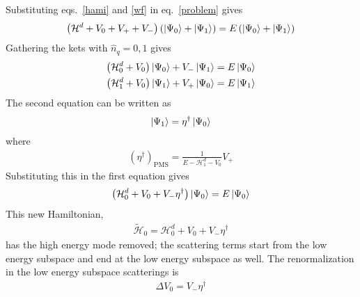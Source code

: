 Substituting eqs.~\ref{hami} and \ref{wf} in eq.~\ref{problem} gives
\begin{equation}\begin{aligned}
	\left(\mathcal{H}^d + V_0 + V_+ + V_-\right)\left(\ket{\Psi_0} + \ket{\Psi_1}\right) = E\left(\ket{\Psi_0} + \ket{\Psi_1}\right)
\end{aligned}\end{equation}
Gathering the kets with \(\hat n_q = 0,1\) gives
\begin{equation}\begin{aligned}
	\left(\mathcal{H}^d_0 + V_0\right)\ket{\Psi_0} + V_- \ket{\Psi_1} = E\ket{\Psi_0}\\
	\left(\mathcal{H}^d_1 + V_0\right)\ket{\Psi_1} + V_+\ket{\Psi_0} = E\ket{\Psi_1}
\end{aligned}\end{equation}
The second equation can be written as
\begin{equation}\begin{aligned}
\ket{\Psi_1} = \eta^\dagger \ket{\Psi_0}
\end{aligned}\end{equation}
where
\begin{equation}\begin{aligned}
	\left(\eta^\dagger\right)_\text{PMS} = \frac{1}{E - \mathcal{H}^d_1 - V_0}V_+
\end{aligned}\end{equation}
Substituting this in the first equation gives
\begin{equation}\begin{aligned}
	\label{reneq}
	\left(\mathcal{H}^d_0 + V_0 + V_- \eta^\dagger\right)\ket{\Psi_0} = E\ket{\Psi_0}
\end{aligned}\end{equation}
This new Hamiltonian,
\begin{equation}\begin{aligned}
	\tilde{\mathcal{H}}_0 = \mathcal{H}^d_0 + V_0 + V_- \eta^\dagger
\end{aligned}\end{equation}
has the high energy mode removed; the scattering terms start from the low energy subspace and end at the low energy subspace as well. The renormalization in the low energy subspace scatterings  is
\begin{equation}\begin{aligned}
	\label{deltaV}
\Delta V_0 = V_- \eta^\dagger
\end{aligned}\end{equation}
